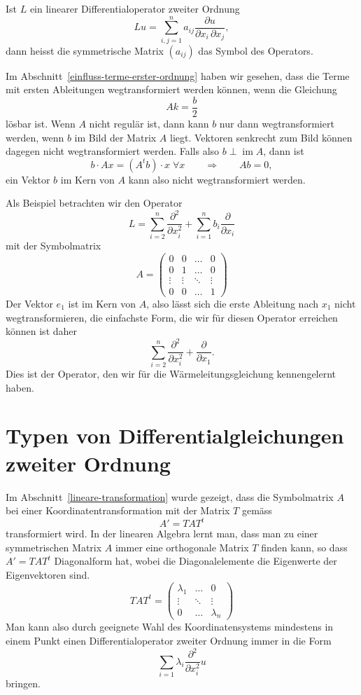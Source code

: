 \begin{definition}Ist $L$ ein linearer Differentialoperator zweiter Ordnung
\[
Lu=\sum_{i,j=1}^na_{ij}\frac{\partial u}{\partial x_i\,\partial x_j},
\]
dann heisst die symmetrische Matrix
$(a_{ij})$ das Symbol des Operators.
\end{definition}

Im Abschnitt~\ref{einfluss-terme-erster-ordnung} haben wir gesehen,
dass die Terme mit ersten Ableitungen wegtransformiert werden können,
wenn die Gleichung 
\[
Ak=\frac{b}2
\]
lösbar ist.
Wenn $A$ nicht regulär ist, dann kann $b$ nur dann wegtransformiert werden,
wenn $b$ im Bild der Matrix $A$ liegt.
Vektoren senkrecht zum Bild können dagegen nicht wegtransformiert werden.
Falls also $b\perp \operatorname{im} A$, dann ist
\[
b\cdot Ax=(A^tb)\cdot x\;\forall x
\qquad\Rightarrow\qquad
Ab=0,
\]
ein Vektor $b$ im Kern von $A$ kann also nicht wegtransformiert werden.

\begin{beispiel}
Als Beispiel betrachten wir den Operator 
\[
L
=
\sum_{i=2}^n\frac{\partial^2}{\partial x_i^2}
+
\sum_{i=1}^nb_i\frac{\partial}{\partial x_i}
\]
mit der Symbolmatrix
\[
A=\begin{pmatrix}
      0&      0& \dots&0\\
      0&      1& \dots&0\\
\vdots &\vdots &\ddots&\vdots\\
      0&      0&\dots &1
\end{pmatrix}
\]
Der Vektor $e_1$ ist im Kern von $A$, also lässt sich die erste
Ableitung nach $x_1$ nicht wegtransformieren, die einfachste
Form, die wir für diesen Operator erreichen können ist daher
\[
\sum_{i=2}^n\frac{\partial^2}{\partial x_i^2}
+
\frac{\partial}{\partial x_1}.
\]
Dies ist der Operator, den wir für die Wärmeleitungsgleichung
kennengelernt haben.
\end{beispiel}

\section{Typen von Differentialgleichungen zweiter Ordnung}
Im Abschnitt~\ref{lineare-transformation} wurde gezeigt, dass die Symbolmatrix
$A$ bei einer Koordinatentransformation mit der Matrix $T$ gemäss
\[
A'=TAT^t 
\]
transformiert wird.
In der linearen Algebra lernt man, dass man zu einer symmetrischen
Matrix $A$ immer eine orthogonale Matrix $T$ finden kann, so dass
$A'=TAT^t$ Diagonalform hat, wobei die Diagonalelemente die
Eigenwerte der Eigenvektoren sind.
\[
TAT^t
=
\begin{pmatrix}\lambda_1&\dots&0\\
\vdots&\ddots&\vdots\\
0&\dots&\lambda_n
\end{pmatrix}
\]
Man kann also durch geeignete Wahl des Koordinatensystems mindestens in
einem Punkt einen Differentialoperator zweiter Ordnung immer in die
Form
\[
\sum_{i=1}\lambda_i\frac{\partial^2}{\partial x_i^2}u
\]
bringen.

